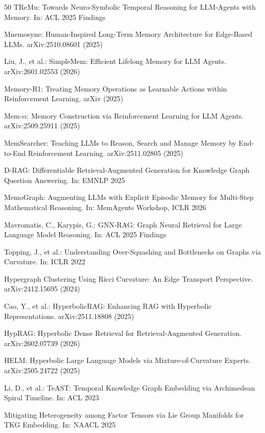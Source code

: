 \documentclass[hf]{ceurart}
\begin{document}
\begin{thebibliography}{50}
TReMu: Towards Neuro-Symbolic Temporal Reasoning for LLM-Agents
with Memory. In: ACL 2025 Findings

Mnemosyne: Human-Inspired Long-Term Memory Architecture for
Edge-Based LLMs. arXiv:2510.08601 (2025)

Liu, J., et al.: SimpleMem: Efficient Lifelong Memory for LLM
Agents. arXiv:2601.02553 (2026)

Memory-R1: Treating Memory Operations as Learnable Actions within
Reinforcement Learning. arXiv (2025)

Mem-$\alpha$: Memory Construction via Reinforcement Learning for
LLM Agents. arXiv:2509.25911 (2025)

MemSearcher: Teaching LLMs to Reason, Search and Manage Memory by
End-to-End Reinforcement Learning. arXiv:2511.02805 (2025)

D-RAG: Differentiable Retrieval-Augmented Generation for Knowledge
Graph Question Answering. In: EMNLP 2025

MemoGraph: Augmenting LLMs with Explicit Episodic Memory for
Multi-Step Mathematical Reasoning. In: MemAgents Workshop, ICLR 2026

Mavromatis, C., Karypis, G.: GNN-RAG: Graph Neural Retrieval for
Large Language Model Reasoning. In: ACL 2025 Findings

Topping, J., et al.: Understanding Over-Squashing and Bottlenecks on
Graphs via Curvature. In: ICLR 2022

Hypergraph Clustering Using Ricci Curvature: An Edge Transport
Perspective. arXiv:2412.15695 (2024)

Cao, Y., et al.: HyperbolicRAG: Enhancing RAG with Hyperbolic
Representations. arXiv:2511.18808 (2025)

HypRAG: Hyperbolic Dense Retrieval for Retrieval-Augmented
Generation. arXiv:2602.07739 (2026)

HELM: Hyperbolic Large Language Models via Mixture-of-Curvature
Experts. arXiv:2505.24722 (2025)

Li, D., et al.: TeAST: Temporal Knowledge Graph Embedding via
Archimedean Spiral Timeline. In: ACL 2023

Mitigating Heterogeneity among Factor Tensors via Lie Group
Manifolds for TKG Embedding. In: NAACL 2025


\end{thebibliography}
\end{document}
